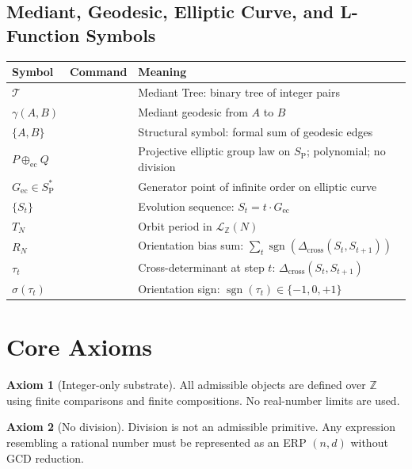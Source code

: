 \documentclass[11pt, letterpaper]{article}
\newcommand{\Z}{\mathbb{Z}}
\newcommand{\SP}{S_{\mathrm{P}}}
\newcommand{\SPs}{S_{\mathrm{P}}^{*}}
\newcommand{\ecplus}{\oplus_{\mathrm{ec}}}
\newcommand{\Dcross}{\Delta_{\mathrm{cross}}}
\newcommand{\sgn}{\operatorname{sgn}}
\newcommand{\LQ}{\mathcal{L}_{\mathbb{Z}}}
\theoremstyle{definition}
\newtheorem{axiom}{Axiom}[section]
\theoremstyle{plain}
\begin{document}
\subsection{Mediant, Geodesic, Elliptic Curve, and L-Function Symbols}

\begin{longtable}{L{2.5cm} L{2.6cm} L{8.5cm}}
\toprule
\textbf{Symbol} & \textbf{Command} & \textbf{Meaning} \\
\midrule\endhead\bottomrule\endfoot

$\mathcal{T}$ & & Mediant Tree: binary tree of integer pairs \\[3pt]
$\gamma(A,B)$ & & Mediant geodesic from $A$ to $B$ \\[3pt]
$\{A,B\}$ & & Structural symbol:
  formal sum of geodesic edges \\[3pt]
$P\ecplus Q$ & & Projective elliptic group law on $\SP$;
  polynomial; no division \\[3pt]
$G_{\mathrm{ec}}\in\SPs$ & & Generator point of infinite order
  on elliptic curve \\[3pt]
$\{S_t\}$ & & Evolution sequence: $S_t=t\cdot G_{\mathrm{ec}}$ \\[3pt]
$T_N$ & & Orbit period in $\LQ(N)$ \\[3pt]
$R_N$ & & Orientation bias sum:
  $\sum_t\sgn(\Dcross(S_t,S_{t+1}))$ \\[3pt]
$\tau_t$ & & Cross-determinant at step $t$:
  $\Dcross(S_t,S_{t+1})$ \\[3pt]
$\sigma(\tau_t)$ & & Orientation sign: $\sgn(\tau_t)\in\{-1,0,+1\}$ \\[3pt]
\end{longtable}

\newpage


\section{Core Axioms}\label{sec:axioms}

\begin{axiom}[Integer-only substrate]\label{ax:integer-substrate}
All admissible objects are defined over $\Z$ using finite comparisons and
finite compositions.  No real-number limits are used.
\end{axiom}

\begin{axiom}[No division]\label{ax:no-division}
Division is not an admissible primitive.  Any expression resembling a
rational number must be represented as an ERP $(n,d)$ without GCD reduction.
\end{axiom}
\end{document}
